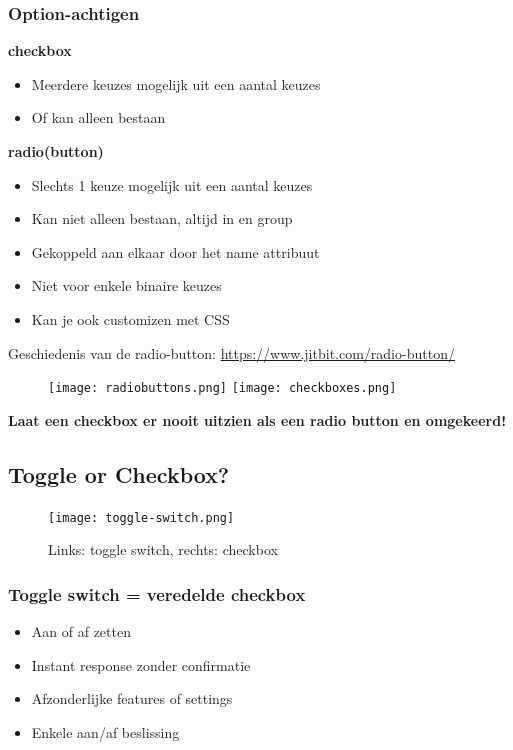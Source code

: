 \documentclass{article}
\newcommand{\bold}[1]{\textbf{#1}}
\begin{document}
\subsubsection{Option-achtigen}

\bold{checkbox}

\begin{itemize}
    \item Meerdere keuzes mogelijk uit een aantal keuzes
    \item Of kan alleen bestaan
\end{itemize}

\bold{radio(button)}

\begin{itemize}
    \item Slechts 1 keuze mogelijk uit een aantal keuzes
    \item Kan niet alleen bestaan, altijd in en group
    \item Gekoppeld aan elkaar door het name attribuut
    \item Niet voor enkele binaire keuzes
    \item Kan je ook customizen met CSS
\end{itemize}

Geschiedenis van de radio-button: \url{https://www.jitbit.com/radio-button/}

\begin{figure}[H]
    \centering
    \texttt{[image: radiobuttons.png]}
    \texttt{[image: checkboxes.png]}
    \caption{}
\end{figure}

\bold{Laat een checkbox er nooit uitzien als een radio button en omgekeerd!}

\subsection{Toggle or Checkbox?}
\begin{figure}[H]
    \centering
    \texttt{[image: toggle-switch.png]}
    \caption{Links: toggle switch, rechts: checkbox}
\end{figure}

\subsubsection{Toggle switch = veredelde checkbox}
\begin{itemize}
    \item Aan of af zetten
    \item Instant response zonder confirmatie
    \item Afzonderlijke features of settings
    \item Enkele aan/af beslissing
\end{itemize}
\end{document}

